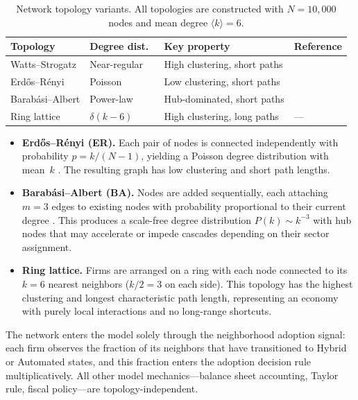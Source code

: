 \documentclass[12pt,a4paper]{article}
\begin{document}
\begin{table}[htbp]
\centering
\caption{Network topology variants. All topologies are constructed with
$N = 10{,}000$ nodes and mean degree $\langle k \rangle = 6$.}
\label{tab:topologies}
\small
\begin{tabular}{@{}l l l l@{}}
\toprule
Topology & Degree dist.\ & Key property & Reference \\
\midrule
Watts--Strogatz      & Near-regular & High clustering, short paths & \textcite{Watts1998} \\
Erd\H{o}s--R\'{e}nyi & Poisson      & Low clustering, short paths  & \textcite{Erdos1959} \\
Barab\'{a}si--Albert  & Power-law    & Hub-dominated, short paths   & \textcite{Barabasi1999} \\
Ring lattice          & $\delta(k{-}6)$ & High clustering, long paths & --- \\
\bottomrule
\end{tabular}
\end{table}

\begin{itemize}
    \item \textbf{Erd\H{o}s--R\'{e}nyi (ER).} Each pair of nodes is connected
    independently with probability $p = k / (N-1)$, yielding a Poisson degree
    distribution with mean~$k$ \parencite{Erdos1959}. The resulting graph has
    low clustering and short path lengths.

    \item \textbf{Barab\'{a}si--Albert (BA).} Nodes are added sequentially,
    each attaching $m = 3$ edges to existing nodes with probability
    proportional to their current degree \parencite{Barabasi1999}. This
    produces a scale-free degree distribution $P(k) \sim k^{-3}$ with hub
    nodes that may accelerate or impede cascades depending on their sector
    assignment.

    \item \textbf{Ring lattice.} Firms are arranged on a ring with each node
    connected to its $k = 6$ nearest neighbors ($k/2 = 3$ on each side). This
    topology has the highest clustering and longest characteristic path length,
    representing an economy with purely local interactions and no long-range
    shortcuts.
\end{itemize}

The network enters the model solely through the neighborhood adoption signal:
each firm observes the fraction of its neighbors that have transitioned to
Hybrid or Automated states, and this fraction enters the adoption decision rule
multiplicatively. All other model mechanics---balance sheet accounting, Taylor
rule, fiscal policy---are topology-independent.
\end{document}
